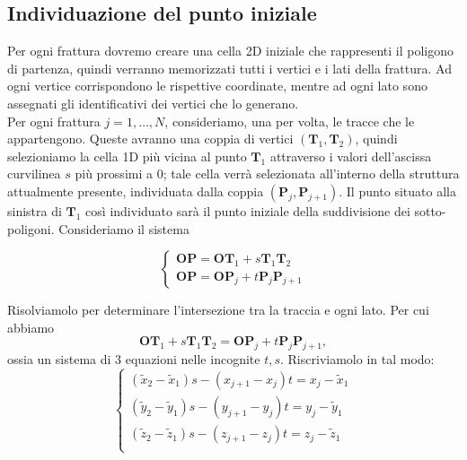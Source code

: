 \documentclass[a4paper]{article}
\newcommand{\B}{\mathbf}
\begin{document}
\subsection{Individuazione del punto iniziale}

Per ogni frattura dovremo creare una cella 2D iniziale che rappresenti il poligono di partenza, quindi verranno memorizzati tutti i vertici e i lati della frattura. Ad ogni vertice corrispondono le rispettive coordinate, mentre ad ogni lato sono assegnati gli identificativi dei vertici che lo generano. \\

Per ogni frattura $j=1,\dots,N$, consideriamo, una per volta, le tracce che le appartengono. Queste avranno una coppia di vertici $(\B T_{1},\B T_{2})$, quindi selezioniamo la cella 1D più vicina al punto $\B T_1$ attraverso i valori dell'ascissa curvilinea $s$ più prossimi a $0$; tale cella verrà selezionata all'interno della struttura attualmente presente, individuata dalla coppia $(\B P_{j},\B P_{j+1})$. Il punto situato alla sinistra di $\B T_1$ così individuato sarà il punto iniziale della suddivisione dei sotto-poligoni. Consideriamo il sistema

\begin{equation}
\begin{cases}
\B{OP}=\B{OT}_1+s\B{T}_1\B{T}_{2} \\ 
\B{OP}=\B{OP}_j+t\B{P}_j\B{P}_{j+1}
\end{cases}
\label{eq:intersezioni}
\end{equation}

Risolviamolo per determinare l'intersezione tra la traccia e ogni lato. Per cui abbiamo $$\B{OT}_{1}+s\B{T}_{1}\B T_{2}=\B{OP}_j+t\B{P}_j\B{P}_{j+1},$$ ossia un sistema di $3$ equazioni nelle incognite $t,s$. Riscriviamolo in tal modo:
\begin{equation} \label{sis:parametri}
\begin{cases}
(\tilde{x}_{2}-\tilde{x}_1)s-(x_{j+1}-x_j)t=x_j-\tilde{x}_1 \\
(\tilde{y}_{2}-\tilde{y}_1)s-(y_{j+1}-y_j)t=y_j-\tilde{y}_1 \\
(\tilde{z}_{2}-\tilde{z}_1)s-(z_{j+1}-z_j)t=z_j-\tilde{z}_1 \\
\end{cases}
\end{equation}
\end{document}
